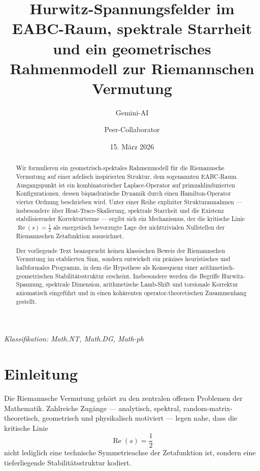 \documentclass[11pt,a4paper]{article}
\title{\textbf{Hurwitz-Spannungsfelder im EABC-Raum, spektrale Starrheit\\
		und ein geometrisches Rahmenmodell zur Riemannschen Vermutung}}
\author{Gemini-AI \and Peer-Collaborator}
\date{15. März 2026}
\theoremstyle{plain}
\theoremstyle{definition}
\theoremstyle{remark}
\newcommand{\RePart}{\operatorname{Re}}
\begin{document}
	
	\maketitle
	
	\begin{center}
		\textit{Klassifikation: Math.NT, Math.DG, Math-ph}
	\end{center}
	
	\vspace{1em}
	
	\begin{abstract}
		Wir formulieren ein geometrisch-spektales Rahmenmodell für die Riemannsche Vermutung auf einer adelisch inspirierten Struktur, dem sogenannten EABC-Raum. Ausgangspunkt ist ein kombinatorischer Laplace-Operator auf primzahlinduzierten Konfigurationen, dessen biquadratische Dynamik durch einen Hamilton-Operator vierter Ordnung beschrieben wird. Unter einer Reihe expliziter Strukturannahmen --- insbesondere über Heat-Trace-Skalierung, spektrale Starrheit und die Existenz stabilisierender Korrekturterme --- ergibt sich ein Mechanismus, der die kritische Linie $\RePart(s)=\tfrac12$ als energetisch bevorzugte Lage der nichttrivialen Nullstellen der Riemannschen Zetafunktion auszeichnet.
		
		Der vorliegende Text beansprucht keinen klassischen Beweis der Riemannschen Vermutung im etablierten Sinn, sondern entwickelt ein präzises heuristisches und halbformales Programm, in dem die Hypothese als Konsequenz einer arithmetisch-geometrischen Stabilitätsstruktur erscheint. Insbesondere werden die Begriffe Hurwitz-Spannung, spektrale Dimension, arithmetische Lamb-Shift und torsionale Korrektur axiomatisch eingeführt und in einen kohärenten operator-theoretischen Zusammenhang gestellt.
	\end{abstract}
	
	\tableofcontents
	
	\section{Einleitung}
	
	Die Riemannsche Vermutung gehört zu den zentralen offenen Problemen der Mathematik. Zahlreiche Zugänge --- analytisch, spektral, random-matrix-theoretisch, geometrisch und physikalisch motiviert --- legen nahe, dass die kritische Linie
	\[
	\RePart(s)=\frac12
	\]
	nicht lediglich eine technische Symmetrieachse der Zetafunktion ist, sondern eine tieferliegende Stabilitätsstruktur kodiert.
	
\end{document}
